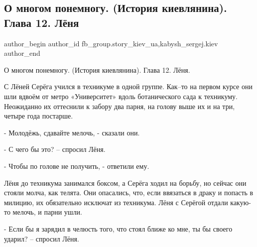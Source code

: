  
 
 
 
 
 
\subsection{О многом понемногу. (История киевлянина). Глава 12. Лёня}
\label{sec:26_12_2021.fb.fb_group.story_kiev_ua.2.istoria_kievljanina_glava_12_ljonja}
 
\ifcmt
 author_begin
   author_id fb_group.story_kiev_ua,kabysh_sergej.kiev
 author_end
\fi

О многом понемногу.  (История киевлянина).  Глава 12. Лёня.

С Лёней Серёга учился в техникуме в одной группе. Как–то на первом курсе они
шли вдвоём от метро «Университет» вдоль ботанического сада к техникуму.
Неожиданно их оттеснили к забору два парня, на голову выше их и на три, четыре
года постарше.

\begin{multicols}{2} %
\setlength{\parindent}{0pt}

\end{multicols} %

- Молодёжь, сдавайте мелочь, - сказали они.

- С чего бы это? – спросил Лёня.

- Чтобы по голове не получить, - ответили ему.

Лёня до техникума занимался боксом, а Серёга ходил на борьбу, но сейчас они
стояли молча, как телята. Они опасались, что, если ввязаться в драку и попасть
в милицию, их обязательно исключат из техникума. Лёня с Серёгой отдали какую-то
мелочь, и парни ушли.

- Если бы я зарядил в челюсть того, что стоял ближе ко мне, ты бы своего
ударил? – спросил Лёня.

